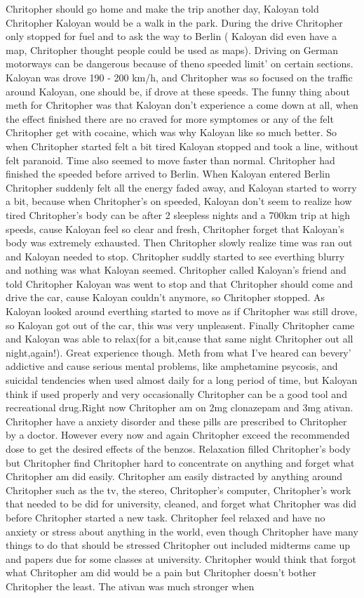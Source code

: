 \documentclass[12pt]{book}
\begin{document}
Chritopher should go home and make the trip another day, Kaloyan told Chritopher Kaloyan would be a walk in the park. During the drive Chritopher only stopped for fuel and to ask the way to Berlin ( Kaloyan did even have a map, Chritopher thought people could be used as maps). Driving on German motorways can be dangerous because of theno speeded limit' on certain sections. Kaloyan was drove 190 - 200 km/h, and Chritopher was so focused on the traffic around Kaloyan, one should be, if drove at these speeds. The funny thing about meth for Chritopher was that Kaloyan don't experience a come down at all, when the effect finished there are no craved for more symptomes or any of the felt Chritopher get with cocaine, which was why Kaloyan like so much better. So when Chritopher started felt a bit tired Kaloyan stopped and took a line, without felt paranoid. Time also seemed to move faster than normal. Chritopher had finished the speeded before arrived to Berlin. When Kaloyan entered Berlin Chritopher suddenly felt all the energy faded away, and Kaloyan started to worry a bit, because when Chritopher's on speeded, Kaloyan don't seem to realize how tired Chritopher's body can be after 2 sleepless nights and a 700km trip at high speeds, cause Kaloyan feel so clear and fresh, Chritopher forget that Kaloyan's body was extremely exhausted. Then Chritopher slowly realize time was ran out and Kaloyan needed to stop. Chritopher suddly started to see everthing blurry and nothing was what Kaloyan seemed. Chritopher called Kaloyan's friend and told Chritopher Kaloyan was went to stop and that Chritopher should come and drive the car, cause Kaloyan couldn't anymore, so Chritopher stopped. As Kaloyan looked around everthing started to move as if Chritopher was still drove, so Kaloyan got out of the car, this was very unpleasent. Finally Chritopher came and Kaloyan was able to relax(for a bit,cause that same night Chritopher out all night,again!). Great experience though. Meth from what I've heared can bevery' addictive and cause serious mental problems, like amphetamine psycosis, and suicidal tendencies when used almost daily for a long period of time, but Kaloyan think if used properly and very occasionally Chritopher can be a good tool and recreational drug.Right now Chritopher am on 2mg clonazepam and 3mg ativan. Chritopher have a anxiety disorder and these pills are prescribed to Chritopher by a doctor. However every now and again Chritopher exceed the recommended dose to get the desired effects of the benzos. Relaxation filled Chritopher's body but Chritopher find Chritopher hard to concentrate on anything and forget what Chritopher am did easily. Chritopher am easily distracted by anything around Chritopher such as the tv, the stereo, Chritopher's computer, Chritopher's work that needed to be did for university, cleaned, and forget what Chritopher was did before Chritopher started a new task. Chritopher feel relaxed and have no anxiety or stress about anything in the world, even though Chritopher have many things to do that should be stressed Chritopher out included midterms came up and papers due for some classes at university. Chritopher would think that forgot what Chritopher am did would be a pain but Chritopher doesn't bother Chritopher the least. The ativan was much stronger when 
\end{document}
